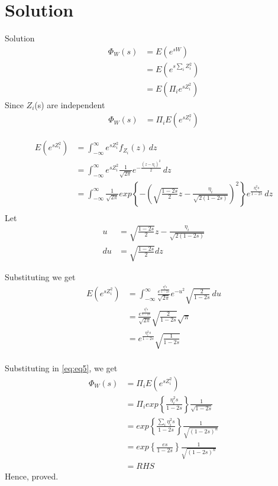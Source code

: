 \documentclass{beamer}
\providecommand{\brak}[1]{\ensuremath{\left(#1\right)}}
\providecommand{\cbrak}[1]{\ensuremath{\left\{#1\right\}}}
\begin{document}
\section{Solution}
\begin{frame}{Solution}
\begin{align}
    \Phi_W(s) &= E(e^{sW})\\
    &=E(e^{s\sum_iZ_i^2})\\
    &= E\brak{\Pi_ie^{sZ_i^2}}
    \end{align}
    Since $Z_i$(s) are independent
    \begin{align}
    \label{eq:eq5}
        \Phi_W(s) &= \Pi_iE(e^{sZ_i^2})
    \end{align}
\end{frame}
\begin{frame}
\begin{align}
    E(e^{sZ_i^2}) &= \int_{-\infty}^{\infty} e^{sZ_i^2} f_{Z_i}(z)\,dz\\
    &= \int_{-\infty}^{\infty} e^{sZ_i^2}\frac{1}{\sqrt{2\pi}}e^{-\frac{(z-\eta_i)^2}{2}}\,dz\\
    &= \int_{-\infty}^{\infty} \frac{1}{\sqrt{2\pi}}exp\cbrak{-\brak{\sqrt{\frac{1-2s}{2}}z-\frac{\eta_i}{\sqrt{2(1-2s)}}}^2}e^{\frac{\eta_i^2s}{1-2s}}\,dz\\
\end{align}
Let 
\begin{align}
    u &= \sqrt{\frac{1-2s}{2}}z-\frac{\eta_i}{\sqrt{2(1-2s)}}\\
    du &= \sqrt{\frac{1-2s}{2}}dz
\end{align}
\end{frame}
\begin{frame}
Substituting we get
\begin{align}
     E(e^{sZ_i^2}) &= \int_{-\infty}^\infty\frac{e^{\frac{\eta_i^2s}{1-2s}}}{\sqrt{2\pi}}e^{-u^2}\sqrt{\frac{2}{1-2s}}\, du\\
     &= \frac{e^{\frac{\eta_i^2s}{1-2s}}}{\sqrt{2\pi}}\sqrt{\frac{2}{1-2s}}\sqrt{\pi}\\
     &= e^{\frac{\eta_i^2s}{1-2s}}\sqrt{\frac{1}{1-2s}}\\
\end{align}
\end{frame}
\begin{frame}
Substituting in \eqref{eq:eq5}, we get
\begin{align}
      \Phi_W(s) &= \Pi_iE(e^{sZ_i^2})\\
      &= \Pi_i exp\cbrak{\frac{\eta_i^2 s}{1-2s}}\frac{1}{\sqrt{1-2s}}\\
      &= exp\cbrak{\frac{\sum_i\eta_i^2 s}{1-2s}}\frac{1}{\sqrt{(1-2s)^n}}\\
      &= exp\cbrak{\frac{e s}{1-2s}}\frac{1}{\sqrt{(1-2s)^n}}\\
      &= RHS
\end{align}
Hence, proved.
\end{frame}
\end{document}
